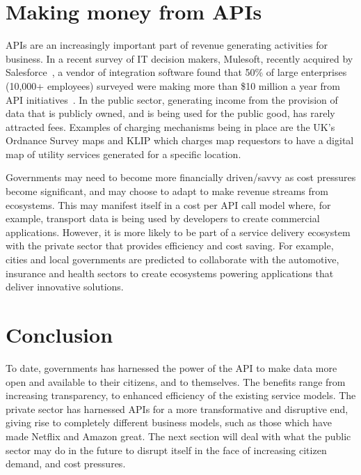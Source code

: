 \section{Making money from APIs}

APIs are an increasingly important part of revenue generating activities for
business. In a recent survey of IT decision makers, Mulesoft, recently acquired
by Salesforce~\citep{mulesoft_salesforce}, a vendor of integration software found that 50\% of
large enterprises (10,000+ employees) surveyed were making more than \$10 million
a year from API initiatives~\citep{mulesoft_api_worth}. In the public sector, generating income
from the provision of data that is publicly owned, and is being used for the
public good, has rarely attracted fees. Examples of charging mechanisms being in
place are the UK’s Ordnance Survey maps and KLIP  which charges map requestors
to have a digital map of utility services generated for a specific location.

Governments may need to become more financially driven/savvy as cost pressures
become significant, and may choose to adapt to make revenue streams from ecosystems.
This may manifest itself in a cost per API call model where, for example, transport
data is being used by developers to create commercial applications. However, it is
more likely to be part of a service delivery ecosystem with the private sector that
provides efficiency and cost saving. For example, cities and local governments are
predicted to collaborate with the automotive, insurance and health sectors to create ecosystems powering applications that deliver
innovative solutions.

\section{Conclusion}

To date, governments has harnessed the power of the API to make data more open and
available to their citizens, and to themselves. The benefits range from increasing transparency, to enhanced efficiency of the existing service models. The private
sector has harnessed APIs for a more transformative and disruptive end, giving rise
to completely different business models, such as those which have made Netflix and
Amazon great. The next section will deal with what the public sector may do in the
future to disrupt itself in the face of increasing citizen demand, and cost pressures.	
